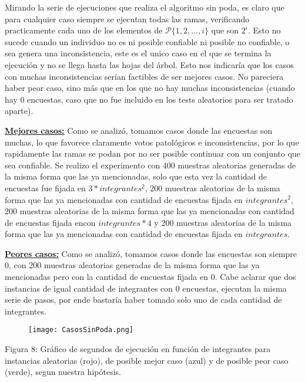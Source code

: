 \documentclass[A4paper,oneside,fleqn,10pt]{article}
\theoremstyle{definition}
\begin{document}
Mirando la serie de ejecuciones que realiza el algoritmo sin poda, es claro que para cualquier caso siempre se ejecutan todas las ramas, verificando practicamente cada uno de los elementos de 
$\mathcal{P} \{1,2,...,i\} $ que son $2^i$.  Esto no sucede cuando un individuo no es ni posible confiable ni posible no confiable, o sea genera una inconsistencia, este es el unico caso en el que se termina la ejecución y no se llega hasta las hojas del árbol. Esto nos indicaría que los casos con muchas inconsistencias serían factibles de ser mejores casos. No pareciera haber peor caso, sino más que en los que no hay muchas inconsistencias (cuando hay 0 encuestas, caso que no fue incluido en los tests aleatorios para ser tratado aparte).

\underline{\textbf{Mejores casos:}} Como se analizó, tomamos casos donde las encuestas son muchas, lo que favorece claramente votos patológicos e inconsistencias, por lo que rapidamente las ramas se podan por no ser posible continuar con un conjunto que sea confiable. Se realizo el experimento con 400 muestras aleatorias generadas de la misma forma que las ya mencionadas, solo que esta vez la cantidad de encuestas fue fijada en $3*integrantes^2$,  200 muestras aleatorias de la misma forma que las ya mencionadas con cantidad de encuestas fijada en $integrantes^2$, 200 muestras aleatorias de la misma forma que las ya mencionadas con cantidad de encuestas fijada encon $integrantes*4$ y 200 muestras aleatorias de la misma forma que las ya mencionadas con cantidad de encuestas fijada en $integrantes$.

\underline{\textbf{Peores casos:}} Como se analizó, tomamos casos donde las encuestas son siempre 0, con 200 muestras aleatorias generadas de la misma forma que las ya mencionadas pero con la cantidad de encuestas fijada en $0$. Cabe aclarar que dos instancias de igual cantidad de integrantes con 0 encuestas, ejecutan la misma serie de pasos, por ende bastaría haber tomado solo uno de cada cantidad de integrantes. 

\begin{figure}[h!]
  \texttt{[image: CasosSinPoda.png]}
  \label{fig:boat7}
\end{figure}
 
\scriptsize 
 Figura 8: Gráfico de segundos de ejecución en función de integrantes para instancias aleatorias (rojo), de posible mejor caso (azul) y de posible peor caso (verde), segun nuestra hipótesis.

\normalsize
\end{document}
